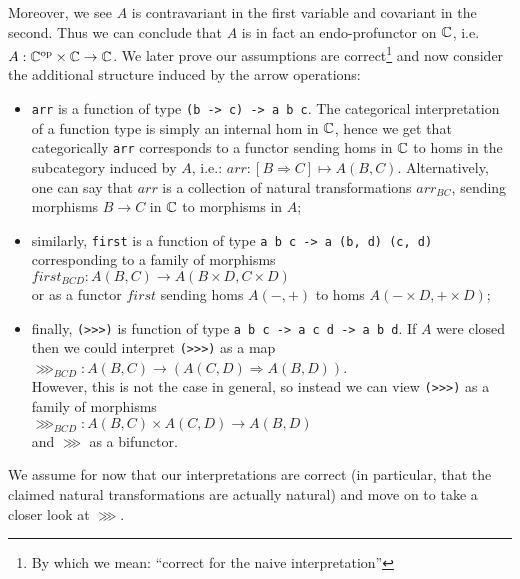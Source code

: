 Moreover, we see $A$ is contravariant in the first variable and covariant in
the second. Thus we can conclude that $A$ is in fact an endo-profunctor on
$\mathbb{C}$, i.e.~$A: {\mathbb{C}}^{\text{op}} \times \mathbb{C} \to \mathbb{C}$. We later prove our
assumptions are correct\footnote{By which we mean: ``correct for the naive
interpretation''} and now consider the additional structure induced by
the arrow operations:

\begin{itemize}
    \item \verb|arr| is a function of type \verb|(b -> c) -> a b c|.
        The categorical interpretation of a function type is simply an internal
        hom in $\mathbb{C}$, hence we get that categorically \verb|arr| corresponds
        to a functor sending homs in $\mathbb{C}$ to homs in the subcategory induced
        by $A$, i.e.: $arr: [B \Rightarrow C] \mapsto A(B, C)$. Alternatively, one
        can say that $arr$ is a collection of natural transformations
        $arr_{BC}$, sending morphisms $B \to C$ in $\mathbb{C}$ to morphisms in $A$;
    \item similarly, \verb|first| is a function of type
        \verb|a b c -> a (b, d) (c, d)|
        corresponding to a family of morphisms\\
        $first_{BCD}: A(B, C) \to A(B \times D,C \times D)$\\
        or as a functor $first$ sending homs $A(-, +)$ to homs $A(- \times D, +
        \times D)$;
    \item finally, \verb|(>>>)| is function of type \verb|a b c -> a c d -> a b d|.
        If $A$ were closed then we could interpret \verb|(>>>)| as a
        map\\
        $\ggg_{BCD}: A(B, C) \to (A(C, D) \Rightarrow A(B, D))$.\\
        However, this is not the case in general, so instead we can view
        \verb|(>>>)| as a family of morphisms\\
        $\ggg_{BCD}: A(B, C) \times A(C, D) \to A(B, D)$\\
        and $\ggg$ as a bifunctor.
\end{itemize}

We assume for now that our interpretations are correct (in particular, that the
claimed natural transformations are actually natural) and move on to take a
closer look at $\ggg$.

